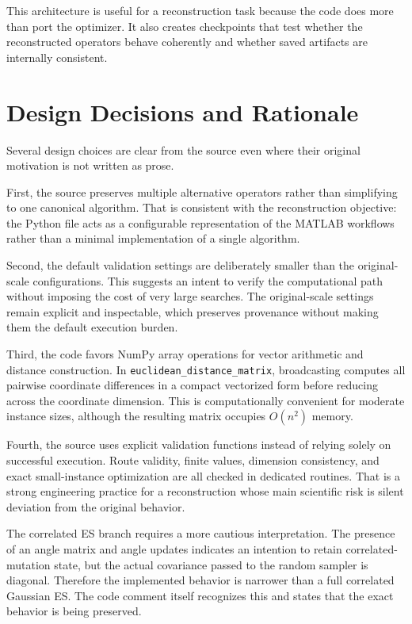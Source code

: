 \documentclass[11pt,a4paper]{article}
\newcommand{\code}[1]{\texttt{#1}}
\begin{document}
This architecture is useful for a reconstruction task because the code does more than port the optimizer. It also creates checkpoints that test whether the reconstructed operators behave coherently and whether saved artifacts are internally consistent.

\section{Design Decisions and Rationale}
Several design choices are clear from the source even where their original motivation is not written as prose.

First, the source preserves multiple alternative operators rather than simplifying to one canonical algorithm. That is consistent with the reconstruction objective: the Python file acts as a configurable representation of the MATLAB workflows rather than a minimal implementation of a single algorithm.

Second, the default validation settings are deliberately smaller than the original-scale configurations. This suggests an intent to verify the computational path without imposing the cost of very large searches. The original-scale settings remain explicit and inspectable, which preserves provenance without making them the default execution burden.

Third, the code favors NumPy array operations for vector arithmetic and distance construction. In \code{euclidean\_distance\_matrix}, broadcasting computes all pairwise coordinate differences in a compact vectorized form before reducing across the coordinate dimension. This is computationally convenient for moderate instance sizes, although the resulting matrix occupies $O(n^2)$ memory.

Fourth, the source uses explicit validation functions instead of relying solely on successful execution. Route validity, finite values, dimension consistency, and exact small-instance optimization are all checked in dedicated routines. That is a strong engineering practice for a reconstruction whose main scientific risk is silent deviation from the original behavior.

The correlated ES branch requires a more cautious interpretation. The presence of an angle matrix and angle updates indicates an intention to retain correlated-mutation state, but the actual covariance passed to the random sampler is diagonal. Therefore the implemented behavior is narrower than a full correlated Gaussian ES. The code comment itself recognizes this and states that the exact behavior is being preserved.
\end{document}

